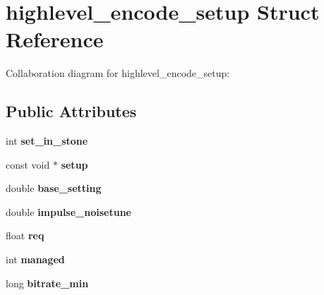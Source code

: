 \hypertarget{structhighlevel__encode__setup}{\section{highlevel\+\_\+encode\+\_\+setup Struct Reference}
\label{structhighlevel__encode__setup}
}


Collaboration diagram for highlevel\+\_\+encode\+\_\+setup\+:
\subsection*{Public Attributes}
\begin{DoxyCompactItemize}
\item 
\hypertarget{structhighlevel__encode__setup_a4ed298ef54491509b77efd242ca9ef4b}{int {\bfseries set\+\_\+in\+\_\+stone}}\label{structhighlevel__encode__setup_a4ed298ef54491509b77efd242ca9ef4b}

\item 
\hypertarget{structhighlevel__encode__setup_a05e4ffe83c4f26fe5305fce8a50d0c42}{const void $\ast$ {\bfseries setup}}\label{structhighlevel__encode__setup_a05e4ffe83c4f26fe5305fce8a50d0c42}

\item 
\hypertarget{structhighlevel__encode__setup_a3bc13656a789f18e24a9d3a29e0ad2f8}{double {\bfseries base\+\_\+setting}}\label{structhighlevel__encode__setup_a3bc13656a789f18e24a9d3a29e0ad2f8}

\item 
\hypertarget{structhighlevel__encode__setup_adc48ac43bf3f4c896d60e7cac2710b19}{double {\bfseries impulse\+\_\+noisetune}}\label{structhighlevel__encode__setup_adc48ac43bf3f4c896d60e7cac2710b19}

\item 
\hypertarget{structhighlevel__encode__setup_a77cd5d92231c63d5d29d34a49a055014}{float {\bfseries req}}\label{structhighlevel__encode__setup_a77cd5d92231c63d5d29d34a49a055014}

\item 
\hypertarget{structhighlevel__encode__setup_a232b52aae5a1dc432c2fde0859a9de30}{int {\bfseries managed}}\label{structhighlevel__encode__setup_a232b52aae5a1dc432c2fde0859a9de30}

\item 
\hypertarget{structhighlevel__encode__setup_a44cebbbf6e74eb249c8f3981a6538c59}{long {\bfseries bitrate\+\_\+min}}\label{structhighlevel__encode__setup_a44cebbbf6e74eb249c8f3981a6538c59}


\end{DoxyCompactItemize}
